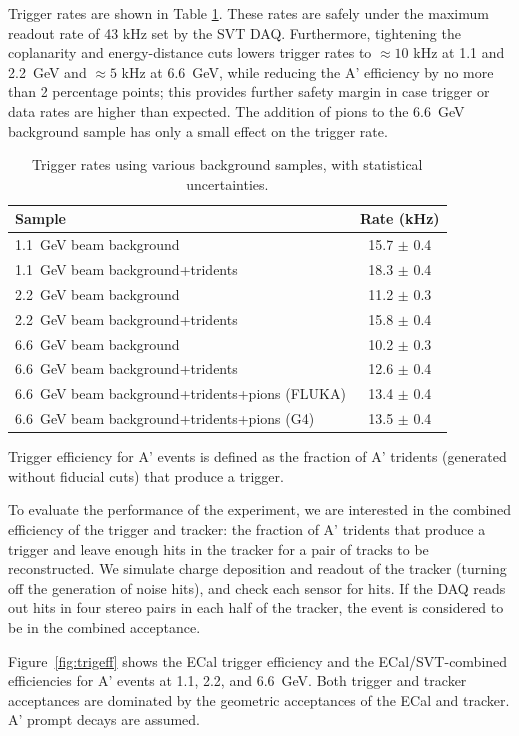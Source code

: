 Trigger rates are shown in Table \ref{tab:trigrates}. These rates are safely under the maximum readout rate of 43 kHz set by the SVT DAQ. 
Furthermore, tightening the coplanarity and energy-distance cuts lowers trigger rates to $\approx 10$ kHz at 1.1 and 2.2~GeV and $\approx 5$ kHz at 6.6~GeV, while reducing the A' efficiency by no more than 2 percentage points; this provides further safety margin in case trigger or data rates are higher than expected.
The addition of pions to the 6.6~GeV background sample has only a small effect on the trigger rate.

\begin{table}
	\begin{tabular}{|l|c|}
		\hline
		Sample &  Rate (kHz)\\
		\hline
		1.1~GeV	beam background 				& 15.7 $\pm$ 0.4	\\
		1.1~GeV beam background+tridents			& 18.3 $\pm$ 0.4	\\
		2.2~GeV	beam background 				& 11.2 $\pm$ 0.3	\\
		2.2~GeV beam background+tridents			& 15.8 $\pm$ 0.4	\\
		6.6~GeV	beam background 				& 10.2 $\pm$ 0.3	\\
		6.6~GeV beam background+tridents			& 12.6 $\pm$ 0.4	\\
		6.6~GeV beam background+tridents+pions (FLUKA)	& 13.4 $\pm$ 0.4	\\
		6.6~GeV beam background+tridents+pions (G4)	& 13.5 $\pm$ 0.4	\\
		\hline
	\end{tabular}
	\caption{ {\small Trigger rates using various background samples, with statistical uncertainties. }
	\label{tab:trigrates}}
\end{table}

Trigger efficiency for A' events is defined as the fraction of A' tridents (generated without fiducial cuts) that produce a trigger.

To evaluate the performance of the experiment, we are interested in the combined efficiency of the trigger and tracker: the fraction of A' tridents that produce a trigger and leave enough hits in the tracker for a pair of tracks to be reconstructed.
We simulate charge deposition and readout of the tracker (turning off the generation of noise hits), and check each sensor for hits. 
If the DAQ reads out hits in four stereo pairs in each half of the tracker, the event is considered to be in the combined acceptance.

Figure~\ref{fig:trigeff} shows the ECal trigger efficiency and the ECal/SVT-combined efficiencies for A' events at 1.1, 2.2, and 6.6~GeV. 
Both trigger and tracker acceptances are dominated by the geometric acceptances of the ECal and tracker.
A' prompt decays are assumed.

